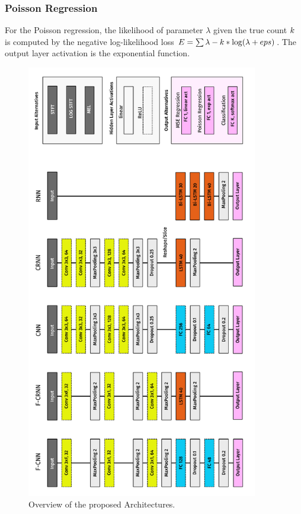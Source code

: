 \subsubsection{Poisson Regression}
For the Poisson regression, the likelihood of parameter \(\lambda \) given the true count \(k \) is computed by the negative log-likelihood loss \(E = \sum \lambda - k * \log(\lambda + eps)\). The output layer activation is the exponential function.

\begin{figure}[!hp]
\centering
\includegraphics[width=0.9\textwidth]{Chapters/08_Analysis_CountNet/figures/networkoverview.pdf}
\caption{Overview of the proposed Architectures.}%
\label{fig:networkoverview}%
\end{figure}

